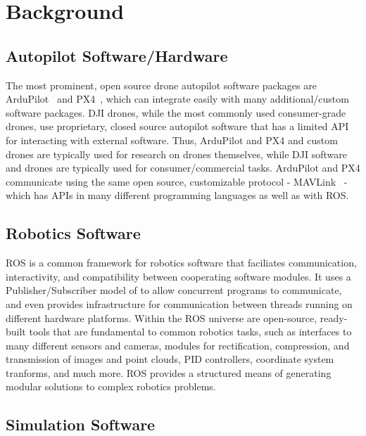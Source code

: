 \section{Background}

\subsection{Autopilot Software/Hardware}

The most prominent, open source drone autopilot software packages are ArduPilot~\cite{ardupilot_website} and PX4~\cite{pixhawk_website},
which can integrate easily with many additional/custom software packages.
DJI drones, while the most commonly used consumer-grade drones, use proprietary, closed source autopilot software
that has a limited API for interacting with external software.
Thus, ArduPilot and PX4 and custom drones are typically used for research on drones themselves,
while DJI software and drones are typically used for consumer/commercial tasks.
ArduPilot and PX4 communicate using the same open source, customizable protocol - MAVLink~\cite{mavlink_io} -
which has APIs in many different programming languages as well as with \gls{ROS}.

\subsection{Robotics Software}

\gls{ROS} is a common framework for robotics software that faciliates communication, interactivity, and compatibility
between cooperating software modules.
It uses a Publisher/Subscriber model of to allow concurrent programs to communicate,
and even provides infrastructure for communication between threads running on different hardware platforms.
Within the ROS universe are open-source, ready-built tools that are fundamental to common robotics tasks,
such as interfaces to many different sensors and cameras,
modules for rectification, compression, and transmission of images and point clouds,
PID controllers,
coordinate system tranforms,
and much more.
ROS provides a structured means of generating modular solutions to complex robotics problems.

\subsection{Simulation Software}

